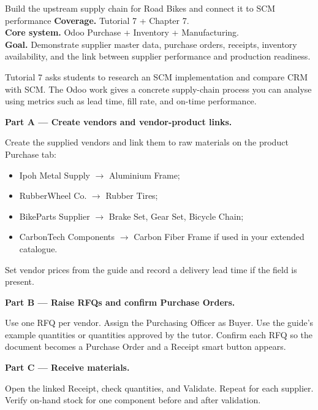 
\begin{labproject}{Build the upstream supply chain for Road Bikes and connect it to SCM performance}
\textbf{Coverage.} Tutorial 7 + Chapter 7.\\
\textbf{Core system.} Odoo Purchase + Inventory + Manufacturing.\\
\textbf{Goal.} Demonstrate supplier master data, purchase orders, receipts, inventory availability, and the link between supplier performance and production readiness.

\begin{labmode}
Tutorial 7 asks students to research an SCM implementation and compare CRM with SCM. The Odoo work gives a concrete supply-chain process you can analyse using metrics such as lead time, fill rate, and on-time performance.
\end{labmode}

\medskip\noindent\textbf{Part A --- Create vendors and vendor-product links.}

Create the supplied vendors and link them to raw materials on the product Purchase tab:
\begin{itemize}
  \item Ipoh Metal Supply $\rightarrow$ Aluminium Frame;
  \item RubberWheel Co. $\rightarrow$ Rubber Tires;
  \item BikeParts Supplier $\rightarrow$ Brake Set, Gear Set, Bicycle Chain;
  \item CarbonTech Components $\rightarrow$ Carbon Fiber Frame if used in your extended catalogue.
\end{itemize}

Set vendor prices from the guide and record a delivery lead time if the field is present.

\medskip\noindent\textbf{Part B --- Raise RFQs and confirm Purchase Orders.}

Use one RFQ per vendor. Assign the Purchasing Officer as Buyer. Use the guide's example quantities or quantities approved by the tutor. Confirm each RFQ so the document becomes a Purchase Order and a Receipt smart button appears.

\medskip\noindent\textbf{Part C --- Receive materials.}

Open the linked Receipt, check quantities, and Validate. Repeat for each supplier. Verify on-hand stock for one component before and after validation.


\end{labproject}
